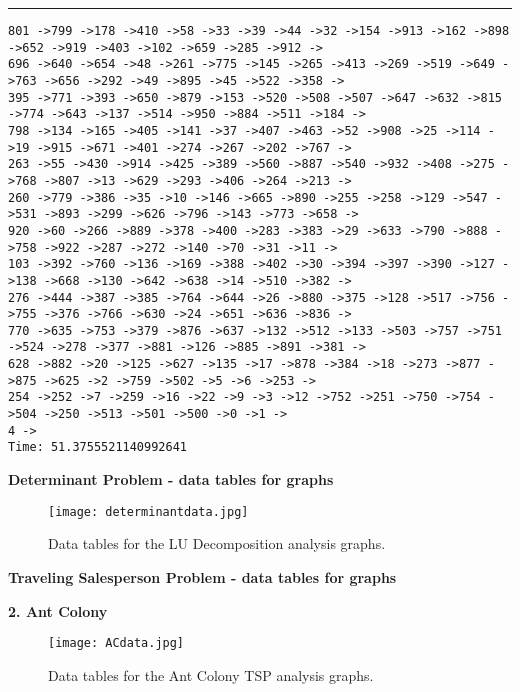 \documentclass[letter, 12pt]{article}
\newenvironment{question}[1]{%
    \vspace{.2in}%
        \noindent{\bf #1}%
    \vspace{0.3em} \hrule \vspace{.1in}%
}{}
\begin{document}
\begin{question}{\large Appendix}
\begin{lstlisting}[style=CStyle]
801 ->799 ->178 ->410 ->58 ->33 ->39 ->44 ->32 ->154 ->913 ->162 ->898 ->652 ->919 ->403 ->102 ->659 ->285 ->912 ->
696 ->640 ->654 ->48 ->261 ->775 ->145 ->265 ->413 ->269 ->519 ->649 ->763 ->656 ->292 ->49 ->895 ->45 ->522 ->358 ->
395 ->771 ->393 ->650 ->879 ->153 ->520 ->508 ->507 ->647 ->632 ->815 ->774 ->643 ->137 ->514 ->950 ->884 ->511 ->184 ->
798 ->134 ->165 ->405 ->141 ->37 ->407 ->463 ->52 ->908 ->25 ->114 ->19 ->915 ->671 ->401 ->274 ->267 ->202 ->767 ->
263 ->55 ->430 ->914 ->425 ->389 ->560 ->887 ->540 ->932 ->408 ->275 ->768 ->807 ->13 ->629 ->293 ->406 ->264 ->213 ->
260 ->779 ->386 ->35 ->10 ->146 ->665 ->890 ->255 ->258 ->129 ->547 ->531 ->893 ->299 ->626 ->796 ->143 ->773 ->658 ->
920 ->60 ->266 ->889 ->378 ->400 ->283 ->383 ->29 ->633 ->790 ->888 ->758 ->922 ->287 ->272 ->140 ->70 ->31 ->11 ->
103 ->392 ->760 ->136 ->169 ->388 ->402 ->30 ->394 ->397 ->390 ->127 ->138 ->668 ->130 ->642 ->638 ->14 ->510 ->382 ->
276 ->444 ->387 ->385 ->764 ->644 ->26 ->880 ->375 ->128 ->517 ->756 ->755 ->376 ->766 ->630 ->24 ->651 ->636 ->836 ->
770 ->635 ->753 ->379 ->876 ->637 ->132 ->512 ->133 ->503 ->757 ->751 ->524 ->278 ->377 ->881 ->126 ->885 ->891 ->381 ->
628 ->882 ->20 ->125 ->627 ->135 ->17 ->878 ->384 ->18 ->273 ->877 ->875 ->625 ->2 ->759 ->502 ->5 ->6 ->253 ->
254 ->252 ->7 ->259 ->16 ->22 ->9 ->3 ->12 ->752 ->251 ->750 ->754 ->504 ->250 ->513 ->501 ->500 ->0 ->1 ->
4 ->
Time: 51.3755521140992641
\end{lstlisting}

\newpage
\textbf{\large Determinant Problem - data tables for graphs}\\

\begin{figure}[H]
  \centering
  \texttt{[image: determinantdata.jpg]}
  \caption{Data tables for the LU Decomposition analysis graphs.}
  \label{fig:detdata}
\end{figure}

\newpage
\textbf{\large Traveling Salesperson Problem - data tables for graphs}\\

\vspace{\baselineskip}

\textbf{2. Ant Colony}\\

\begin{figure}[H]
  \centering
  \texttt{[image: ACdata.jpg]}
  \caption{Data tables for the Ant Colony TSP analysis graphs.}
  \label{fig:detdata}
\end{figure}

\end{question}
\end{document}
